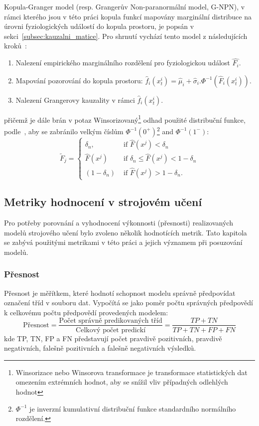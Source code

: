 Kopula-Granger model (resp. Grangerův Non-paranormální model, G-NPN), v rámci
kterého jsou v této práci kopula funkcí mapovány marginální distribuce na úrovni
fyziologických událostí do kopula prostoru, je popsán v
sekci~\ref{subsec:kauzalni_matice}. Pro shrnutí vychází tento model z
následujících kroků~\cite{Guy2016}:
\begin{enumerate}
    \item Nalezení empirického marginálního rozdělení pro fyziologickou událost
          $\hat{F_i}$.
    \item Mapování pozorování do kopula prostoru:
          $\hat{f}_i\left(x_t^i\right)=\hat{\mu}_i+\hat{\sigma}_i.
              \Phi^{-1}\left(\hat{F}_i\left(x_t^i\right)\right)$.
    \item Nalezení Grangerovy kauzality v rámci $\hat{f}_i\left(x_t^i\right)$.
\end{enumerate}
přičemž je dále brán v potaz Winsorizovaný\footnote{Winsorizace nebo Winsorova
    transformace je transformace statistických dat omezením extrémních hodnot, aby
    se snížil vliv případných odlehlých hodnot} odhad použité distribuční funkce,
podle~\cite{Bahadori2013}, aby se zabránilo velkým číslům
$\Phi^{-1}\left(0^{+}\right)$\footnote{$\Phi^{-1}$ je inverzní kumulativní
    distribuční funkce standardního normálního rozdělení.} and
$\Phi^{-1}\left(1^{-}\right)$:
\begin{equation}
    \tilde{F}_j= \begin{cases}\delta_n, & \text { if } \hat{F}\left(x^j\right)<\delta_n \\ \hat{F}\left(x^j\right) & \text { if } \delta_n \leq \hat{F}\left(x^j\right)<1-\delta_n \\ \left(1-\delta_n\right) & \text { if } \hat{F}\left(x^j\right)>1-\delta_n .\end{cases}
\end{equation}

\subsection{Metriky hodnocení v strojovém učení}
\label{subsec:ml_metriky}
Pro potřeby porovnání a vyhodnocení výkonnosti (přesnosti) realizovaných modelů
strojového učení bylo zvoleno několik hodnotících metrik. Tato kapitola se
zabývá použitými metrikami v této práci a jejich významem při posuzování modelů.

\subsubsection{Přesnost}
Přesnost je měřítkem, které hodnotí schopnost modelu správně předpovídat
označení tříd v souboru dat. Vypočítá se jako poměr počtu správných předpovědí k
celkovému počtu předpovědí provedených modelem:
\begin{equation}
    \text{Přesnost} = \frac{\text{Počet správně predikovaných tříd}}{\text{Celkový počet predickí}} = \frac{TP + TN}{TP + TN + FP + FN}
\end{equation}
kde TP, TN, FP a FN představují počet pravdivě pozitivních, pravdivě
negativních, falešně pozitivních a falešně negativních výsledků.

